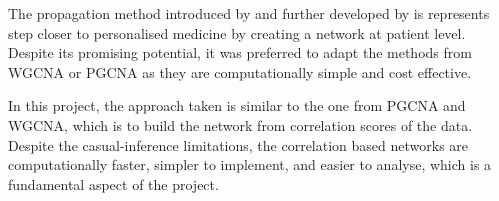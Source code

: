 The propagation method introduced by \citet{Hofree2013-ld} and further developed by \citet{He2017-dj} is represents step closer to personalised medicine by creating a network at patient level. Despite its promising potential, it was preferred to adapt the methods from WGCNA or PGCNA as they are computationally simple and cost effective.

In this project, the approach taken is similar to the one from PGCNA and WGCNA, which is to build the network from correlation scores of the data. Despite the casual-inference limitations, the correlation based networks are computationally faster, simpler to implement, and easier to analyse, which is a fundamental aspect of the project.